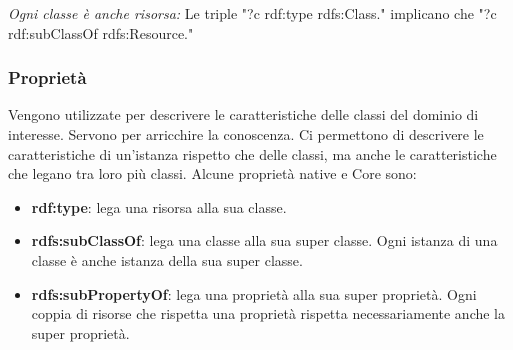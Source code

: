 \begin{info}
	\newline \textit{Ogni classe è anche risorsa:}\newline
	Le triple \textcolor{ao(english)}{"?c rdf:type rdfs:Class."} implicano che \textcolor{ao(english)}{"?c rdf:subClassOf rdfs:Resource."}
\end{info}

\subsubsection{Proprietà}
Vengono utilizzate per descrivere le caratteristiche delle classi del dominio di interesse. Servono per arricchire la conoscenza. Ci permettono di descrivere le caratteristiche di un'istanza rispetto che delle classi, ma anche le caratteristiche che legano tra loro più classi.\newline
Alcune proprietà native e Core sono:
\begin{itemize}
	\item \textbf{rdf:type}: lega una risorsa alla sua classe.
	\item \textbf{rdfs:subClassOf}: lega una classe alla sua super classe. Ogni istanza di una classe è anche istanza della sua super classe.
	\item \textbf{rdfs:subPropertyOf}: lega una proprietà alla sua super proprietà. Ogni coppia di risorse che rispetta una proprietà rispetta necessariamente anche la super proprietà.
\end{itemize}


